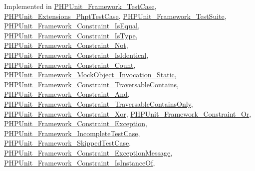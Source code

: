 Implemented in \mbox{\hyperlink{class_p_h_p_unit___framework___test_case_a5558c5d549f41597377fa1ea8a1cefa3}{P\+H\+P\+Unit\+\_\+\+Framework\+\_\+\+Test\+Case}}, \mbox{\hyperlink{class_p_h_p_unit___extensions___phpt_test_case_a5558c5d549f41597377fa1ea8a1cefa3}{P\+H\+P\+Unit\+\_\+\+Extensions\+\_\+\+Phpt\+Test\+Case}}, \mbox{\hyperlink{class_p_h_p_unit___framework___test_suite_a5558c5d549f41597377fa1ea8a1cefa3}{P\+H\+P\+Unit\+\_\+\+Framework\+\_\+\+Test\+Suite}}, \mbox{\hyperlink{class_p_h_p_unit___framework___constraint___is_equal_a5558c5d549f41597377fa1ea8a1cefa3}{P\+H\+P\+Unit\+\_\+\+Framework\+\_\+\+Constraint\+\_\+\+Is\+Equal}}, \mbox{\hyperlink{class_p_h_p_unit___framework___constraint___is_type_a5558c5d549f41597377fa1ea8a1cefa3}{P\+H\+P\+Unit\+\_\+\+Framework\+\_\+\+Constraint\+\_\+\+Is\+Type}}, \mbox{\hyperlink{class_p_h_p_unit___framework___constraint___not_a5558c5d549f41597377fa1ea8a1cefa3}{P\+H\+P\+Unit\+\_\+\+Framework\+\_\+\+Constraint\+\_\+\+Not}}, \mbox{\hyperlink{class_p_h_p_unit___framework___constraint___is_identical_a5558c5d549f41597377fa1ea8a1cefa3}{P\+H\+P\+Unit\+\_\+\+Framework\+\_\+\+Constraint\+\_\+\+Is\+Identical}}, \mbox{\hyperlink{class_p_h_p_unit___framework___constraint___count_a5558c5d549f41597377fa1ea8a1cefa3}{P\+H\+P\+Unit\+\_\+\+Framework\+\_\+\+Constraint\+\_\+\+Count}}, \mbox{\hyperlink{class_p_h_p_unit___framework___mock_object___invocation___static_a5558c5d549f41597377fa1ea8a1cefa3}{P\+H\+P\+Unit\+\_\+\+Framework\+\_\+\+Mock\+Object\+\_\+\+Invocation\+\_\+\+Static}}, \mbox{\hyperlink{class_p_h_p_unit___framework___constraint___traversable_contains_a5558c5d549f41597377fa1ea8a1cefa3}{P\+H\+P\+Unit\+\_\+\+Framework\+\_\+\+Constraint\+\_\+\+Traversable\+Contains}}, \mbox{\hyperlink{class_p_h_p_unit___framework___constraint___and_a5558c5d549f41597377fa1ea8a1cefa3}{P\+H\+P\+Unit\+\_\+\+Framework\+\_\+\+Constraint\+\_\+\+And}}, \mbox{\hyperlink{class_p_h_p_unit___framework___constraint___traversable_contains_only_a5558c5d549f41597377fa1ea8a1cefa3}{P\+H\+P\+Unit\+\_\+\+Framework\+\_\+\+Constraint\+\_\+\+Traversable\+Contains\+Only}}, \mbox{\hyperlink{class_p_h_p_unit___framework___constraint___xor_a5558c5d549f41597377fa1ea8a1cefa3}{P\+H\+P\+Unit\+\_\+\+Framework\+\_\+\+Constraint\+\_\+\+Xor}}, \mbox{\hyperlink{class_p_h_p_unit___framework___constraint___or_a5558c5d549f41597377fa1ea8a1cefa3}{P\+H\+P\+Unit\+\_\+\+Framework\+\_\+\+Constraint\+\_\+\+Or}}, \mbox{\hyperlink{class_p_h_p_unit___framework___constraint___exception_a5558c5d549f41597377fa1ea8a1cefa3}{P\+H\+P\+Unit\+\_\+\+Framework\+\_\+\+Constraint\+\_\+\+Exception}}, \mbox{\hyperlink{class_p_h_p_unit___framework___incomplete_test_case_a5558c5d549f41597377fa1ea8a1cefa3}{P\+H\+P\+Unit\+\_\+\+Framework\+\_\+\+Incomplete\+Test\+Case}}, \mbox{\hyperlink{class_p_h_p_unit___framework___skipped_test_case_a5558c5d549f41597377fa1ea8a1cefa3}{P\+H\+P\+Unit\+\_\+\+Framework\+\_\+\+Skipped\+Test\+Case}}, \mbox{\hyperlink{class_p_h_p_unit___framework___constraint___exception_message_a5558c5d549f41597377fa1ea8a1cefa3}{P\+H\+P\+Unit\+\_\+\+Framework\+\_\+\+Constraint\+\_\+\+Exception\+Message}}, \mbox{\hyperlink{class_p_h_p_unit___framework___constraint___is_instance_of_a5558c5d549f41597377fa1ea8a1cefa3}{P\+H\+P\+Unit\+\_\+\+Framework\+\_\+\+Constraint\+\_\+\+Is\+Instance\+Of}}, 